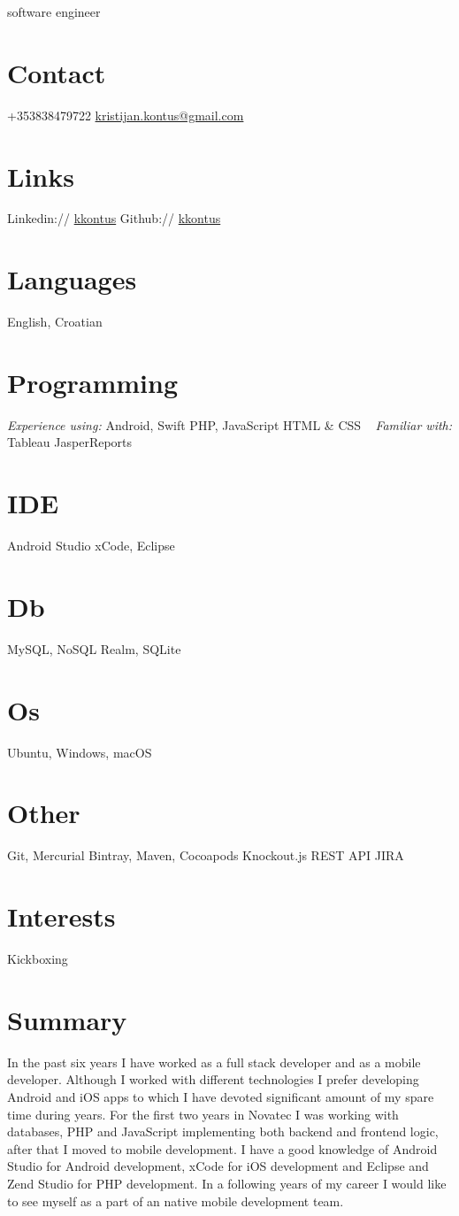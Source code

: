 \documentclass[print]{cv}
\begin{document}
{software engineer}
       
\begin{aside}
	\section{Contact}
	+353838479722
	\href{mailto:kristijan.kontus@gmail.com}{kristijan.kontus@gmail.com}  
	\section{Links}  
	Linkedin:// \href{https://www.linkedin.com/in/kkontus}{kkontus}
	Github:// \href{https://www.github.com/kkontus}{kkontus}
	\section{Languages}
	English, Croatian
	\section{Programming}
	\emph{Experience using:}
	Android, Swift
	PHP, JavaScript
	HTML \& CSS
	~     
	\emph{Familiar with:}
	Tableau
	JasperReports
	\section{IDE}
	Android Studio
	xCode, Eclipse
	\section{Db}
	MySQL, NoSQL
	Realm, SQLite
	\section{Os}
	Ubuntu, Windows, macOS
	\section{Other}
	Git, Mercurial
	Bintray, Maven, Cocoapods
	Knockout.js
	REST API
	JIRA
	\section{Interests}
	Kickboxing
\end{aside}



\section{Summary}
In the past six years I have worked as a full stack developer and as a mobile developer. Although I worked with different technologies I prefer developing Android and iOS apps to which I have devoted significant amount of my spare time during years. For the first two years in Novatec I was working with databases, PHP and JavaScript implementing both backend and frontend logic, after that I moved to mobile development. I have a good knowledge of Android Studio for Android development, xCode for iOS development and Eclipse and Zend Studio for PHP development. In a following years of my career I would like to see myself as a part of an native mobile development team.
\end{document}

